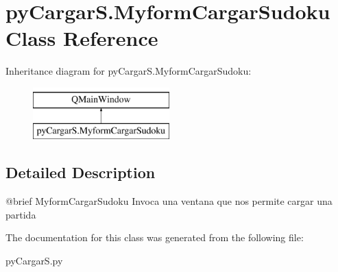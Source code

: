 \hypertarget{classpy_cargar_s_1_1_myform_cargar_sudoku}{\section{py\-Cargar\-S.\-Myform\-Cargar\-Sudoku Class Reference}
\label{classpy_cargar_s_1_1_myform_cargar_sudoku}
}
Inheritance diagram for py\-Cargar\-S.\-Myform\-Cargar\-Sudoku\-:\begin{figure}[H]
\begin{center}
\leavevmode
\includegraphics[height=2.000000cm]{classpy_cargar_s_1_1_myform_cargar_sudoku}
\end{center}
\end{figure}


\subsection{Detailed Description}
\begin{DoxyVerb}@brief MyformCargarSudoku
    Invoca una ventana que nos permite cargar una partida
\end{DoxyVerb}
 

The documentation for this class was generated from the following file\-:\begin{DoxyCompactItemize}
\item 
py\-Cargar\-S.\-py\end{DoxyCompactItemize}
